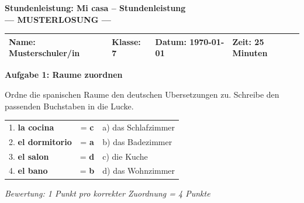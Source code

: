 \documentclass[11pt, a4paper]{article}
\newcommand{\fachfarbe}{spanisch}
\newcommand{\thema}{Mi casa -- Stundenleistung}
\newcommand{\klasse}{7}
\newcommand{\dauer}{25 Minuten}
\newcommand{\datum}{\today}
\newcommand{\punktebox}[1]{\hfill\fbox{\small \_/#1}}
\newcommand{\loesung}[1]{\textcolor{loesung}{\textbf{#1}}}
\newenvironment{aufgabe}[1]{%
    \needspace{5\baselineskip}%
    \nopagebreak[4]%
    \vspace{10pt}
    \noindent\textbf{\textcolor{\fachfarbe}{Aufgabe #1}}
    \nopagebreak[4]%
    \vspace{5pt}
    \nopagebreak[4]%
    \begin{list}{}{\leftmargin=0pt}
    \item[]
}{%
    \end{list}
}
\newcommand{\es}[1]{\textcolor{\fachfarbe}{\textbf{#1}}}
\begin{document}

\begin{center}
    {\Large\bfseries\textcolor{\fachfarbe}{Stundenleistung: \thema}}\\[0.3em]
    {\large\textcolor{loesung}{\textbf{--- MUSTERLOSUNG ---}}}
\end{center}

\vspace{5pt}

\noindent
\begin{tabularx}{\textwidth}{|X|X|X|X|}
\hline
\textbf{Name:} \textcolor{loesung}{Musterschuler/in} &
\textbf{Klasse:} \klasse &
\textbf{Datum:} \datum &
\textbf{Zeit:} \dauer \\
\hline
\end{tabularx}

\vspace{15pt}


\begin{aufgabe}{1: Raume zuordnen}
Ordne die spanischen Raume den deutschen Ubersetzungen zu. Schreibe den passenden Buchstaben in die Lucke. \punktebox{4}
\end{aufgabe}

\begin{center}
\begin{tabular}{lcp{6cm}}
1. \es{la cocina} & = \loesung{c} & a) das Schlafzimmer \\[0.8em]
2. \es{el dormitorio} & = \loesung{a} & b) das Badezimmer \\[0.8em]
3. \es{el salon} & = \loesung{d} & c) die Kuche \\[0.8em]
4. \es{el bano} & = \loesung{b} & d) das Wohnzimmer \\
\end{tabular}
\end{center}

\textit{\textcolor{grau}{Bewertung: 1 Punkt pro korrekter Zuordnung = 4 Punkte}}

\vspace{15pt}

\end{document}
